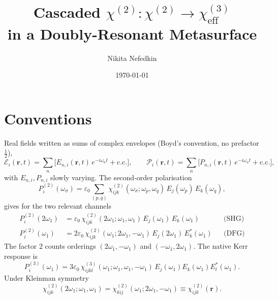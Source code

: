 \documentclass[11pt,a4paper]{article}
\newcommand{\eps}{\varepsilon}
\newcommand{\bvec}[1]{\mathbf{#1}}
\newcommand{\ri}{\bvec{r}}
\newcommand{\chitwo}{\chi^{(2)}}
\newcommand{\chithree}{\chi^{(3)}}
\begin{document}
\title{Cascaded $\chi^{(2)}{:}\chi^{(2)} \to \chi^{(3)}_\text{eff}$ \\
       in a Doubly-Resonant Metasurface\\[2pt]
       }
\author{Nikita Nefedkin}
\date{\today}
\maketitle

\section{Conventions}\label{sec:conventions}

Real fields written as sums of complex envelopes (Boyd's convention, no
prefactor $\tfrac12$),
\begin{equation}
  \mathcal{E}_i(\ri,t)=\sum_n\!\bigl[E_{n,i}(\ri,t)\,e^{-i\omega_n t}+\mathrm{c.c.}\bigr],\qquad
  \mathcal{P}_i(\ri,t)=\sum_n\!\bigl[P_{n,i}(\ri,t)\,e^{-i\omega_n t}+\mathrm{c.c.}\bigr],
\end{equation}
with $E_{n,i},P_{n,i}$ slowly varying. The second-order polarisation
\begin{equation}
  P_i^{(2)}(\omega_\sigma)=\eps_0\!\!\sum_{(p,q)}\!\chitwo_{ijk}(\omega_\sigma;\omega_p,\omega_q)\,E_j(\omega_p)\,E_k(\omega_q),
\end{equation}
gives for the two relevant channels
\begin{align}
  P_i^{(2)}(2\omega_1)&=\eps_0\,\chitwo_{ijk}(2\omega_1;\omega_1,\omega_1)\,E_j(\omega_1)\,E_k(\omega_1) &&\text{(SHG)}\label{eq:PSHG}\\
  P_i^{(2)}(\omega_1)&=2\eps_0\,\chitwo_{ijk}(\omega_1;2\omega_1,-\omega_1)\,E_j(2\omega_1)\,E_k^*(\omega_1) &&\text{(DFG)}\label{eq:PDFG}
\end{align}
The factor $2$ counts orderings $(2\omega_1,-\omega_1)$ and $(-\omega_1,2\omega_1)$. The native Kerr response is
\begin{equation}
  P_i^{(3)}(\omega_1)=3\eps_0\,\chithree_{ijkl}(\omega_1;\omega_1,\omega_1,-\omega_1)\,
                     E_j(\omega_1)E_k(\omega_1)E_l^*(\omega_1).
\end{equation}
Under Kleinman symmetry
\begin{equation}
  \chitwo_{ijk}(2\omega_1;\omega_1,\omega_1)=\chitwo_{kij}(\omega_1;2\omega_1,-\omega_1)\equiv\chitwo_{ijk}(\ri).
\end{equation}
\end{document}
